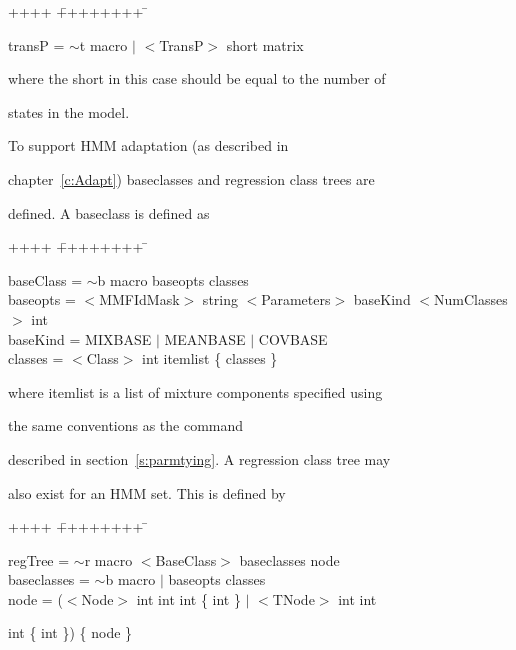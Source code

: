 {\sf


\begin{tabbing}


++++ \= ++++++++ \=  \kill


\>   transP = \> $\sim$t macro $|$ $<$TransP$>$ short matrix


\end{tabbing}


}


\noindent


where the {\sf short} in this case should be equal to the number of


states in the model. 





To support HMM adaptation (as described in


chapter~\ref{c:Adapt}) baseclasses and regression class trees are


defined.  A baseclass is defined as {\sf


\begin{tabbing}


++++ \= ++++++++ \=  \kill


\>   baseClass = \> $\sim$b macro  baseopts classes\\


\>   baseopts  =  \> $<$MMFIdMask$>$ string $<$Parameters$>$ baseKind $<$NumClasses$>$ int\\


\>   baseKind  = \>MIXBASE $|$ MEANBASE $|$ COVBASE \\


\>   classes   = \> $<$Class$>$ int itemlist  \{ classes \} \\


\end{tabbing}


} 


\noindent


where itemlist is a list of mixture components specified using


the same conventions as the  command


described in section~\ref{s:parmtying}.  A regression class tree may


also exist for an HMM set. This is defined by {\sf


\begin{tabbing}


++++ \= ++++++++ \=  \kill


\>   regTree = \> $\sim$r macro $<$BaseClass$>$ baseclasses node \\


\>   baseclasses = \> $\sim$b macro $|$ baseopts classes \\


\>   node    = \> ($<$Node$>$ int int int \{ int \}  $|$ $<$TNode$>$ int int


int \{ int \}) \{ node \}


\end{tabbing}


}


